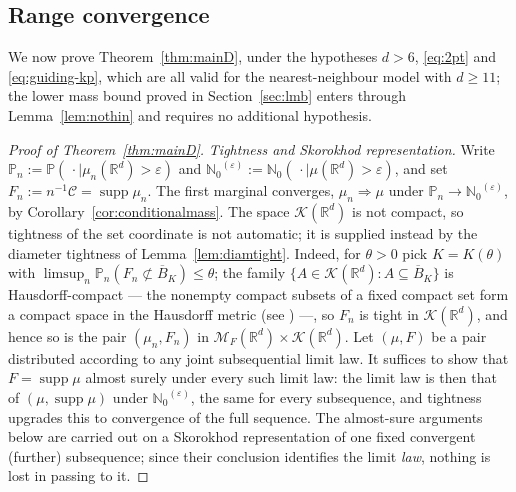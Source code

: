 \documentclass[11pt]{article}
\theoremstyle{definition}
\theoremstyle{remark}
\newcommand{\R}{\mathbb{R}}
\newcommand{\bP}{\mathbb{P}}
\newcommand{\bN}{{\mathbb{N}_0}}                 %
\newcommand{\cM}{{\mathcal{M}_F(\R^d)}}          %
\newcommand{\supp}{\operatorname{supp}}
\newcommand{\eps}{\varepsilon}
\numberwithin{equation}{section}
\theoremstyle{plain}
\theoremstyle{definition}
\theoremstyle{remark}
\theoremstyle{plain}
\begin{document}
\subsection{Range convergence}

We now prove Theorem~\ref{thm:mainD}, under the hypotheses $d>6$,
\eqref{eq:2pt} and \eqref{eq:guiding-kp}, which are all valid for the
nearest-neighbour model with $d\ge 11$; the lower mass bound proved in
Section~\ref{sec:lmb} enters through Lemma~\ref{lem:nothin} and requires no
additional hypothesis.


\begin{proof}[Proof of Theorem~\ref{thm:mainD}]
\emph{Tightness and Skorokhod representation.}
Write $\bP_n:=\bP(\,\cdot\mid\mu_n(\R^d)>\eps)$ and
$\bN^{(\eps)}:=\bN(\,\cdot\mid\mu(\R^d)>\eps)$, and set
$F_n:=n^{-1}\mathcal C=\supp\mu_n$. The first marginal converges,
$\mu_n\Rightarrow\mu$ under $\bP_n\to\bN^{(\eps)}$, by
Corollary~\ref{cor:conditionalmass}. The space $\mathcal
K(\R^d)$ is not compact, so tightness of the set coordinate is not automatic;
it is supplied instead by the diameter tightness of
Lemma~\ref{lem:diamtight}. Indeed, for $\theta>0$ pick $K=K(\theta)$ with
$\limsup_n\bP_n(F_n\not\subset\overline B_K)\le\theta$; the family
$\{A\in\mathcal K(\R^d):A\subseteq\overline B_K\}$ is Hausdorff-compact ---
the nonempty compact subsets of a fixed compact set form a compact space in
the Hausdorff metric (see \cite[Theorem~3.85(3)]{AB06}) ---, so
$F_n$ is tight in $\mathcal K(\R^d)$, and hence so is the pair $(\mu_n,F_n)$ in
$\cM\times\mathcal K(\R^d)$. Let $(\mu,F)$ be a pair distributed according to any joint subsequential
limit law. It suffices to show that $F=\supp\mu$ almost surely under every
such limit law: the limit law is then that of $(\mu,\supp\mu)$ under
$\bN^{(\eps)}$, the same for every subsequence, and tightness upgrades this to
convergence of the full sequence. The almost-sure arguments below are carried
out on a Skorokhod representation of one fixed convergent (further)
subsequence; since their conclusion identifies the limit \emph{law}, nothing
is lost in passing to it.


\end{proof}
\end{document}
